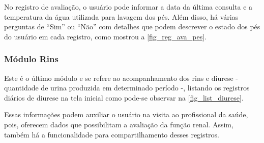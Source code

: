 \begin{figure}[htb]
\begin{minipage}{0.45\textwidth}
    \end{minipage}
\end{figure}

No registro de avaliação, o usuário pode informar a data da última consulta e a temperatura da água utilizada
para lavagem dos pés. Além disso, há várias perguntas de “Sim” ou “Não” com detalhes que podem descrever o
estado dos pés do usuário em cada registro, como mostrou a \autoref{fig_reg_ava_pes}.

\subsubsection{Módulo Rins}

Este é o último módulo e se refere ao acompanhamento dos rins e diurese - quantidade de urina produzida em
determinado período -, listando os registros diários de diurese na tela inicial como pode-se observar na
\autoref{fig_list_diurese}.

Essas informações podem auxiliar o usuário na visita ao profissional da saúde, pois, oferecem dados que
possibilitam a avaliação da função renal. Assim, também há a funcionalidade para compartilhamento desses
registros.

